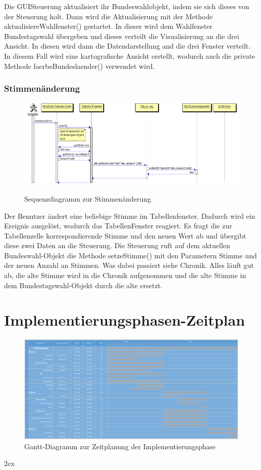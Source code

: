 \documentclass[12pt,a4paper,titlepage]{article}
\begin{document}
Die GUISteuerung aktualisiert ihr Bundeswahlobjekt, indem sie sich dieses von der Steuerung holt. Dann wird die Aktualisierung mit der Methode aktualisiereWahlfenster() gestartet. In dieser wird dem Wahlfenster Bundestagswahl übergeben und dieses verteilt die Visualisierung an die drei Ansicht. In diesen wird dann die Datendarstellung and die drei Fenster verteilt. In diesem Fall wird eine kartografische Ansicht erstellt, wodurch auch die private Methode faerbeBundeslaender() verwendet wird.

\newpage
\subsubsection{Stimmenänderung}
\begin{figure}
\centering
\includegraphics[scale=0.5]{GUI_Stimmenaenderung}\\ \caption{Sequenzdiagramm zur Stimmenänderung}
\end{figure}
Der Benutzer ändert eine beliebige Stimme im Tabellenfenster. Dadurch wird ein Ereignis ausgelöst, wodurch das
TabellenFenster reagiert. Es fragt die zur Tabellenzelle korrespondierende Stimme und den neuen Wert ab und übergibt
diese zwei Daten an die Steuerung. Die Steuerung ruft auf dem aktuellen Bundeswahl-Objekt die Methode setzeStimme()
mit den Parametern Stimme und der neuen Anzahl an Stimmen. Was dabei passiert siehe Chronik. Alles läuft gut ab, die alte Stimme wird in die Chronik aufgenommen und die alte Stimme in dem Bundestagswahl-Objekt durch die alte ersetzt.
\newpage
\section{Implementierungsphasen-Zeitplan}
\begin{figure}[!ht]
\centering
\includegraphics[angle=90, scale=0.45]{Gantt-Diagramm} \caption{Gantt-Diagramm zur Zeitplanung der Implementierungsphase}
\end{figure}


\begingroup
\parindent 0pt
\parskip 2ex
\def\enotesize{\normalsize}

\endgroup
\end{document}
